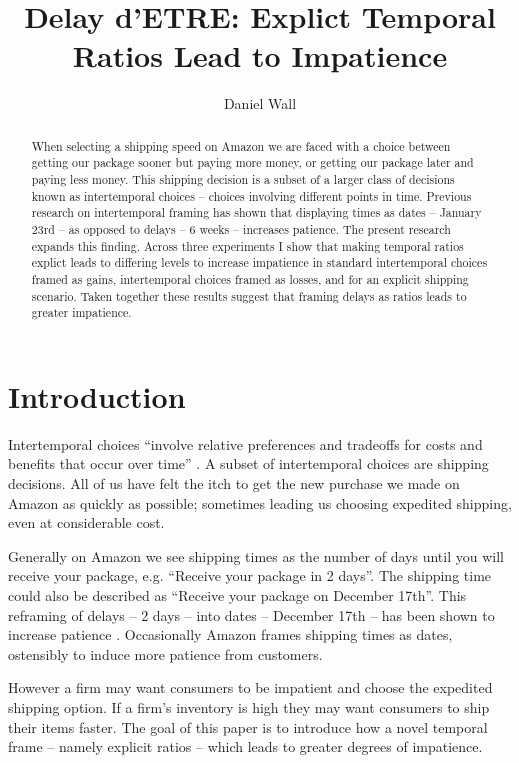 \documentclass[]{article}
\title{Delay d'ETRE: Explict Temporal Ratios Lead to Impatience}
\author{Daniel Wall}
\begin{document}
\maketitle

\begin{abstract}
	When selecting a shipping speed on Amazon we are faced with a choice between getting our package sooner but paying more money, or getting our package later and paying less money. 
	This shipping decision is a subset of a larger class of decisions known as intertemporal choices -- choices involving different points in time. 
	Previous research on intertemporal framing has shown that displaying times as dates -- January 23rd -- as opposed to delays -- 6 weeks -- increases patience. 
	The present research expands this finding. 
	Across three experiments I show that making temporal ratios explict leads to differing levels to increase impatience in standard  intertemporal choices framed as gains, intertemporal choices framed as losses, and for an explicit shipping scenario. 
	Taken together these results suggest that framing delays as ratios leads to greater impatience.

\end{abstract}

\section{Introduction}

Intertemporal choices ``involve relative preferences and tradeoffs for costs and benefits that occur over time'' \cite[p. 2]{Zauberman2014}.
A subset of intertemporal choices are shipping decisions.
All of us have felt the itch to get the new purchase we made on Amazon as quickly as possible; sometimes leading us choosing expedited shipping, even at considerable cost.

Generally on Amazon we see shipping times as the number of days until you will receive your package, e.g.  ``Receive your package in 2 days''. 
The shipping time could also be described as ``Receive your package on December 17th''. 
This reframing of delays -- 2 days -- into dates -- December 17th -- has been shown to increase patience \cite{Read2005}.
Occasionally Amazon frames shipping times as dates, ostensibly to induce more patience from customers. 

However a firm may want consumers to be impatient and choose the expedited shipping option. 
If a firm's inventory is high they may want consumers to ship their items faster. 
The goal of this paper is to introduce how a novel temporal frame -- namely explicit ratios -- which leads to greater degrees of impatience.
\end{document}
